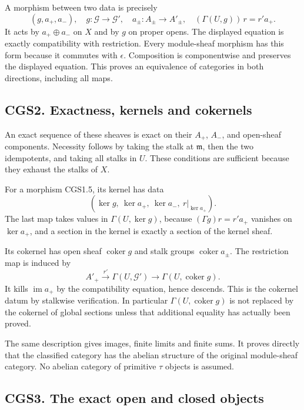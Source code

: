 A morphism between two data is precisely \[
 (g,a_+,a_-),\quad
 g:\mathcal G\to\mathcal G',\quad
 a_\pm:A_\pm\to A'_\pm,\quad
 (\Gamma(U,g))\,r=r'a_+.
\tag{CGS1.5}
\] It acts by \(a_+\oplus a_-\) on \(X\) and by \(g\) on proper opens.
The displayed equation is exactly compatibility with restriction. Every
module-sheaf morphism has this form because it commutes with
\(\epsilon\). Composition is componentwise and preserves the displayed
equation. This proves an equivalence of categories in both directions,
including all maps.

\subsection{CGS2. Exactness, kernels and
cokernels}\label{cgs2.-exactness-kernels-and-cokernels}

An exact sequence of these sheaves is exact on their \(A_+\), \(A_-\),
and open-sheaf components. Necessity follows by taking the stalk at
\(\mathfrak m\), then the two idempotents, and taking all stalks in
\(U\). These conditions are sufficient because they exhaust the stalks
of \(X\).

For a morphism CGS1.5, its kernel has data \[
 \left(\ker g,\ \ker a_+,\ \ker a_-,\ r|_{\ker a_+}\right).
\tag{CGS2.1}
\] The last map takes values in \(\Gamma(U,\ker g)\), because
\((\Gamma g)r=r'a_+\) vanishes on \(\ker a_+\), and a section in the
kernel is exactly a section of the kernel sheaf.

Its cokernel has open sheaf \(\operatorname{coker}g\) and stalk groups
\(\operatorname{coker}a_\pm\). The restriction map is induced by \[
 A'_+\xrightarrow{r'}\Gamma(U,\mathcal G')
 \longrightarrow\Gamma(U,\operatorname{coker}g).
\tag{CGS2.2}
\] It kills \(\operatorname{im}a_+\) by the compatibility equation,
hence descends. This is the cokernel datum by stalkwise verification. In
particular \(\Gamma(U,\operatorname{coker}g)\) is not replaced by the
cokernel of global sections unless that additional equality has actually
been proved.

The same description gives images, finite limits and finite sums. It
proves directly that the classified category has the abelian structure
of the original module-sheaf category. No abelian category of primitive
\(\tau\) objects is assumed.

\subsection{CGS3. The exact open and closed
objects}\label{cgs3.-the-exact-open-and-closed-objects}

